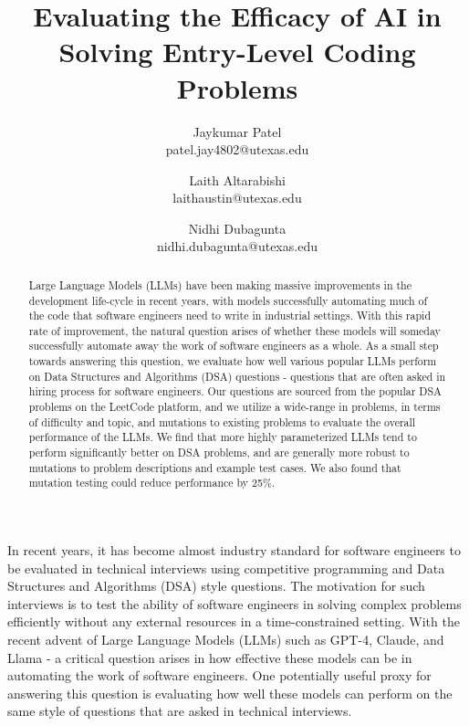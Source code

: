 \documentclass[times, 10pt,twocolumn]{article}
\begin{document}
\title{Evaluating the Efficacy of AI in Solving Entry-Level Coding Problems}

\author{Jaykumar Patel\\
patel.jay4802@utexas.edu\\
\and
Laith Altarabishi\\
laithaustin@utexas.edu\\
\and
Nidhi Dubagunta\\
nidhi.dubagunta@utexas.edu\\
}

\maketitle
\thispagestyle{empty}

\begin{abstract}
Large Language Models (LLMs) have been making massive improvements in the development life-cycle in recent years, with models successfully automating much of the code that software engineers need to write in industrial settings. With this rapid rate of improvement, the natural question arises of whether these models will someday successfully automate away the work of software engineers as a whole. As a small step towards answering this question, we evaluate how well various popular LLMs perform on Data Structures and Algorithms (DSA) questions - questions that are often asked in hiring process for software engineers. Our questions are sourced from the popular DSA problems on the LeetCode platform, and we utilize a wide-range in problems, in terms of difficulty and topic, and mutations to existing problems to evaluate the overall performance of the LLMs. We find that more highly parameterized LLMs tend to perform significantly better on DSA problems, and are generally more robust to mutations to problem descriptions and example test cases. We also found that mutation testing could reduce performance by 25\%.
\end{abstract}


In recent years, it has become almost industry standard for software engineers to be evaluated in technical interviews using competitive programming and Data Structures and Algorithms (DSA) style questions. The motivation for such interviews is to test the ability of software engineers in solving complex problems efficiently without any external resources in a time-constrained setting. With the recent advent of Large Language Models (LLMs) such as GPT-4, Claude, and Llama - a critical question arises in how effective these models can be in automating the work of software engineers. One potentially useful proxy for answering this question is evaluating how well these models can perform on the same style of questions that are asked in technical interviews.
\end{document}
